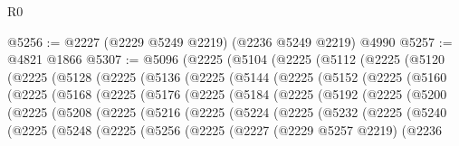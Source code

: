 \begin{lexlean}{R0}
\begin{coremodule}
@5256 := @2227 (@2229 @5249 @2219) (@2236 @5249 @2219) @4990
@5257 := @4821 @1866
@5307 := @5096
    (@2225
      (@5104
        (@2225
          (@5112
            (@2225
              (@5120
                (@2225
                  (@5128
                    (@2225
                      (@5136
                        (@2225
                          (@5144
                            (@2225
                              (@5152
                                (@2225
                                  (@5160
                                    (@2225
                                      (@5168
                                        (@2225
                                          (@5176
                                            (@2225
                                              (@5184
                                                (@2225
                                                  (@5192
                                                    (@2225
                                                      (@5200
                                                        (@2225
                                                          (@5208
                                                            (@2225
                                                              (@5216
                                                                (@2225
                                                                  (@5224
                                                                    (@2225
                                                                      (@5232
                                                                        (@2225
                                                                          (@5240
                                                                            (@2225
                                                                              (@5248
                                                                                (@2225
                                                                                  (@5256
                                                                                    (@2225
                                                                                      (@2227
                                                                                        (@2229
                                                                                          @5257
                                                                                          @2219)
                                                                                        (@2236

\end{coremodule}
\end{lexlean}
